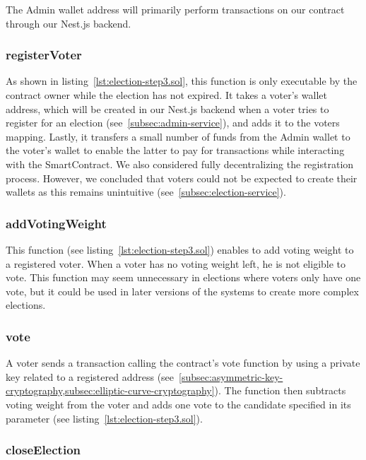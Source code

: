 The \gls{Admin} wallet address will primarily perform transactions on our contract through our Nest.js backend.


\subsubsection{registerVoter}

As shown in listing~\ref{lst:election-step3.sol}, this function is only executable by the contract owner while the election has not expired.
It takes a voter’s wallet address, which will be created in our Nest.js backend when a voter tries to register for an election (see~\cref{subsec:admin-service}), and adds it to the voters mapping.
Lastly, it transfers a small number of funds from the \gls{Admin} wallet to the voter’s wallet to enable the latter to pay for transactions while interacting with the \gls{SmartContract}.
We also considered fully decentralizing the registration process.
However, we concluded that voters could not be expected to create their wallets as this remains unintuitive (see~\cref{subsec:election-service}).

\subsubsection{addVotingWeight}

This function (see listing~\ref{lst:election-step3.sol}) enables  to add voting weight to a registered voter.
When a voter has no voting weight left, he is not eligible to vote.
This function may seem unnecessary in elections where voters only have one vote, but it could be used in later versions of the systems to create more complex elections.

\subsubsection{vote}

A voter sends a transaction calling the contract's vote function by using a private key related to a registered address (see~\cref{subsec:asymmetric-key-cryptography,subsec:elliptic-curve-cryptography}).
The function then subtracts voting weight from the voter and adds one vote to the candidate specified in its parameter (see listing~\ref{lst:election-step3.sol}).

\subsubsection{closeElection}

